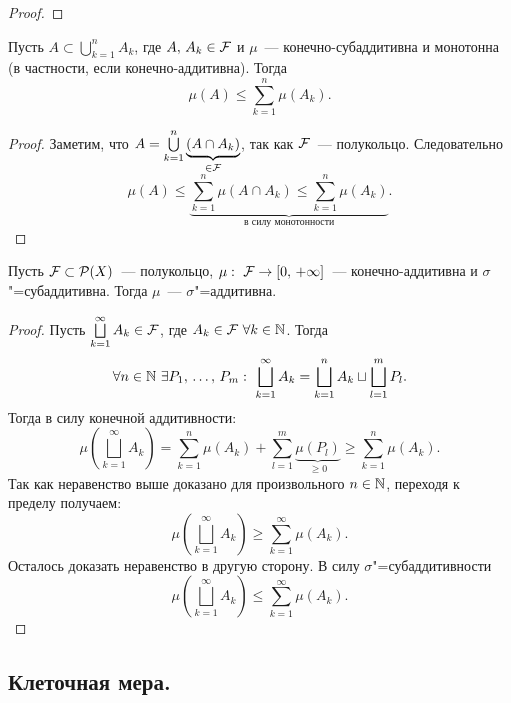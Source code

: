 \begin{claim}
\begin{proof}
    \end{proof}
\end{claim}

\begin{remark}
    Пусть $A\subset \bigcup\limits_{k=1}^n A_k$, где $A,\, A_k\in\mathcal{F} $ и $\mu$~--- конечно-субаддитивна и монотонна (в частности, если
    конечно-аддитивна).
    Тогда \[\mu(A)\leqslant\sum_{k=1}^n\mu(A_k).\]

    \begin{proof}
        Заметим, что $A=\bigcup\limits_{k=1}^n\underbrace{\left(A\cap A_k\right)}_{\in\mathcal{F} }$, так как $\mathcal{F} $~--- полукольцо.
        Следовательно \[
            \mu(A)\leqslant\underbrace{\sum_{k=1}^n\mu(A\cap A_k)\leqslant\sum_{k=1}^n \mu(A_k)}_{\text{в силу монотонности}}.
        \]

    \end{proof}
\end{remark}

\begin{claim}
    \label{lect5:cl2}
    Пусть $\mathcal{F} \subset\mathcal{P}(X)$~--- полукольцо, $\mu:\ \mathcal{F} \rightarrow[0,\,+\infty]$~--- конечно-аддитивна и $\sigma$"=субаддитивна. Тогда
    $\mu$~--- $\sigma$"=аддитивна.

    \begin{proof}
        Пусть $\bigsqcup\limits_{k=1}^{\infty}A_k\in\mathcal{F} $, где $A_k\in\mathcal{F} \ \forall k\in \mathbb{N}$.
        Тогда \[
            \forall n\in\N\ \exists P_1,\,\ldots,\, P_m:\ \bigsqcup\limits_{k=1}^{\infty}A_k=\bigsqcup\limits_{k=1}^{n}A_k\sqcup\bigsqcup
            \limits_{l=1}^{m}P_l.
        \]
        Тогда в силу конечной аддитивности:
        \[
            \mu\left(\bigsqcup_{k=1}^{\infty}A_k\right)=\sum_{k=1}^n\mu(A_k)+\sum_{l=1}^m \underbrace{\mu(P_l)}_{\geqslant 0}
            \geqslant \sum_{k=1}^n\mu(A_k).
        \]
        Так как неравенство выше доказано для произвольного $n\in\mathbb{N}$, переходя к пределу получаем:
        \[
            \mu\left(\bigsqcup_{k=1}^{\infty}A_k\right)\geqslant\sum_{k=1}^{\infty}\mu(A_k).
        \]
        Осталось доказать неравенство в другую сторону. В силу $\sigma$"=субаддитивности
        \[
            \mu\left(\bigsqcup_{k=1}^{\infty}A_k\right)\leqslant\sum_{k=1}^{\infty}\mu(A_k).
        \]

    \end{proof}
\end{claim}

\subsection{Клеточная мера.}


